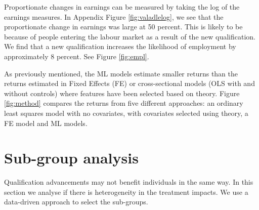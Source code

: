 \documentclass[12pt, a4paper]{article}
\begin{document}
Proportionate changes in earnings can be measured by taking the log of the earnings measures. In Appendix Figure \ref{fig:valadlelog}, we see that the proportionate change in earnings was large at 50 percent. This is likely to be because of people entering the labour market as a result of the new qualification. We find that a new qualification increases the likelihood of employment by approximately 8 percent. See Figure \ref{fig:empl}.

As previously mentioned, the ML models estimate smaller returns than the returns estimated in Fixed Effects (FE) or cross-sectional models (OLS with and without controls) where features have been selected based on theory. Figure \ref{fig:method} compares the returns from five different approaches: an ordinary least squares model with no covariates, with covariates selected using theory, a FE model and ML models.

%

\section{Sub-group analysis}

Qualification advancements may not benefit individuals in the same way. In this section we analyse if there is heterogeneity in the treatment impacts. We use a data-driven approach to select the sub-groups.  
%
%
\end{document}

